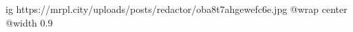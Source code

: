  
 
 
 
 

\ifcmt
  ig https://mrpl.city/uploads/posts/redactor/oba8t7ahgewefc6e.jpg
  @wrap center
  @width 0.9
\fi
